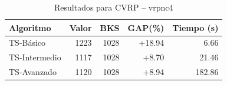 \begin{table}[h]
\centering
\caption{Resultados para CVRP -- vrpnc4}
\label{tab:vrp_vrpnc4}
\begin{tabular}{lrrrr}
\hline
\textbf{Algoritmo} & \textbf{Valor} & \textbf{BKS} & \textbf{GAP(\%)} & \textbf{Tiempo (s)} \\
\hline
TS-Básico & 1223 & 1028 & +18.94 & 6.66 \\
TS-Intermedio & 1117 & 1028 & +8.70 & 21.46 \\
TS-Avanzado & 1120 & 1028 & +8.94 & 182.86 \\
\hline
\end{tabular}
\end{table}
